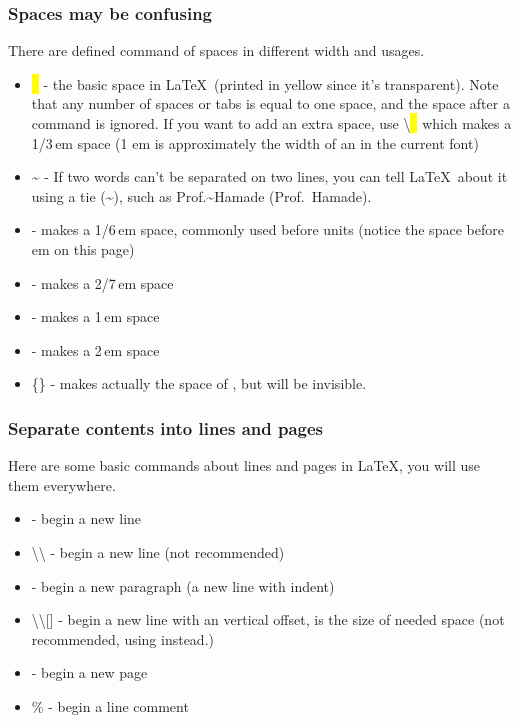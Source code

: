 \begin{frame}
	\frametitle{Spaces may be confusing}
	There are defined command of spaces in different width and usages.
	\begin{itemize}
		\item \colorbox{yellow}{\ } - the basic space in \LaTeX\ (printed in yellow since it's transparent). Note that any number of spaces or tabs is equal to one space, and the space after a command is ignored. If you want to add an extra space, use \alert{\textbackslash}\colorbox{yellow}{\ } which makes a 1/3\,em space (1 em is approximately the width of an  in the current font)
		\item \~{} - If two words can't be separated on two lines, you can tell \LaTeX\ about it using a tie (\~{}), such as Prof.\~{}Hamade (Prof.~Hamade).
		\item  \samplecommand{,} - makes a 1/6\,em space, commonly used before units (notice the space before em on this page)
		\item  \samplecommand{;} - makes a 2/7\,em space
		\item  {} - makes a 1\,em space
		\item  {} - makes a 2\,em space
		\item  {}\{\} - makes actually the space of , but  will be invisible.
	\end{itemize}
\end{frame}

\begin{frame}
	\frametitle{Separate contents into lines and pages}
	Here are some basic commands about lines and pages in \LaTeX,  you will use them everywhere.
	\begin{itemize}
		\item {} - begin a new line
		\item \alert{\textbackslash\textbackslash} - begin a new line (not recommended\footnotemark[1])
		\item {} - begin a new paragraph (a new line with indent)
		\item \alert{\textbackslash\textbackslash [}\alert{]} - begin a new line with an vertical offset,  is the size of needed space  (not recommended, using  \LC{\vspace} instead.)
		\item {} - begin a new page
		\item \alert{\%} - begin a line comment
	\end{itemize}
\end{frame}

